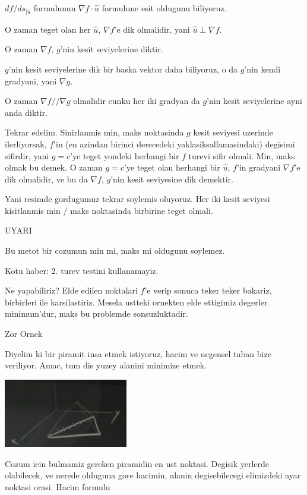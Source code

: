 \documentclass[12pt,fleqn]{article}
\begin{document}
$df / ds_{|\hat{u}}$ formulunun $\nabla f \cdot \hat{u}$ formulune esit oldugunu  biliyoruz. 

O zaman teget olan her $\hat{u}$, $\nabla f$'e dik olmalidir, yani $\hat{u} \perp \nabla f$. 

O zaman $\nabla f$, $g$'nin kesit seviyelerine diktir. 

$g$'nin kesit seviyelerine dik bir baska vektor daha biliyoruz, o 
da $g$'nin kendi gradyani, yani $\nabla g$. 

O zaman $\nabla f // \nabla g$ olmalidir cunku her iki gradyan da $g$'nin
kesit seviyelerine ayni anda diktir. 

Tekrar edelim. Sinirlanmis min, maks noktasinda $g$ kesit seviyesi uzerinde
ilerliyorsak, $f$'in (en azindan birinci derecedeki yaklasiksallamasindaki)
degisimi sifirdir, yani $g=c$'ye teget yondeki herhangi bir $f$ turevi sifir
olmali. Min, maks olmak bu demek. O zaman $g=c$'ye teget olan herhangi bir
$\hat{u}$, $f$'in gradyani $\nabla f$'e dik olmalidir, ve bu da $\nabla f$,
$g$'nin kesit seviyesine dik demektir. 

Yani resimde gordugumuz tekrar soylemis oluyoruz. Her iki kesit seviyesi
kisitlanmis min / maks noktasinda birbirine teget olmali.

UYARI

Bu metot bir cozumun min mi, maks mi oldugunu soylemez. 

Kotu haber: 2. turev testini kullanamayiz. 

Ne yapabiliriz? Elde edilen noktalari $f$'e verip sonuca teker teker
bakariz, birbirleri ile karsilastiriz. Mesela ustteki ornekten elde
ettigimiz degerler minimum'dur, maks bu problemde sonsuzluktadir.

Zor Ornek

Diyelim ki bir piramit insa etmek istiyoruz, hacim ve ucgensel taban bize
veriliyor. Amac, tum dis yuzey alanini minimize etmek. 

\includegraphics[height=3cm]{13_8.png}

Cozum icin bulmamiz gereken piramidin en ust noktasi. Degisik yerlerde
olabilecek, ve nerede olduguna gore hacimin, alanin degisebilecegi
elimizdeki ayar noktasi orasi. Hacim formulu
\end{document}
